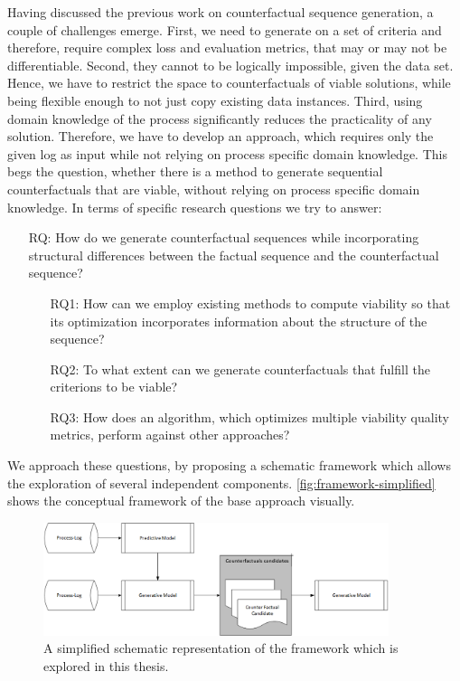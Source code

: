 \documentclass[./../../paper.tex]{subfiles}
\begin{document}
Having discussed the previous work on counterfactual sequence generation, a couple of challenges emerge.
First, we need to generate on a set of criteria and therefore, require complex loss and evaluation metrics, that may or may not be differentiable. Second, they cannot to be logically impossible, given the data set.
Hence, we have to restrict the space to counterfactuals of viable solutions, while being flexible enough to not just copy existing data instances.
Third, using domain knowledge of the process significantly reduces the practicality of any solution. Therefore, we have to develop an approach, which requires only the given log as input while not relying on process specific domain knowledge. This begs the question, whether there is a method to generate sequential counterfactuals that are viable, without relying on process specific domain knowledge. In terms of specific research questions we try to answer:

\begin{itemize}
    \item[RQ:] How do we generate counterfactual sequences while incorporating structural differences between the factual sequence and the counterfactual sequence?
          \begin{itemize}
            \item[RQ1:] How can we employ existing methods to compute viability so that its optimization incorporates information about the structure of the sequence?
              \item[RQ2:] To what extent can we generate counterfactuals that fulfill the criterions to be viable?
              \item[RQ3:] How does an algorithm, which optimizes multiple viability quality metrics, perform against other approaches?
          \end{itemize}
\end{itemize}

\noindent We approach these questions, by proposing a schematic framework which allows the exploration of several independent components. \autoref{fig:framework-simplified} shows the conceptual framework of the base approach visually.

\begin{figure}[htb]
    \centering
    \includegraphics[width=0.9\textwidth]{figures/framework_simplified.png}
    \caption{A simplified schematic representation of the framework which is explored in this thesis.}
    \label{fig:framework-simplified}
\end{figure}
\end{document}
